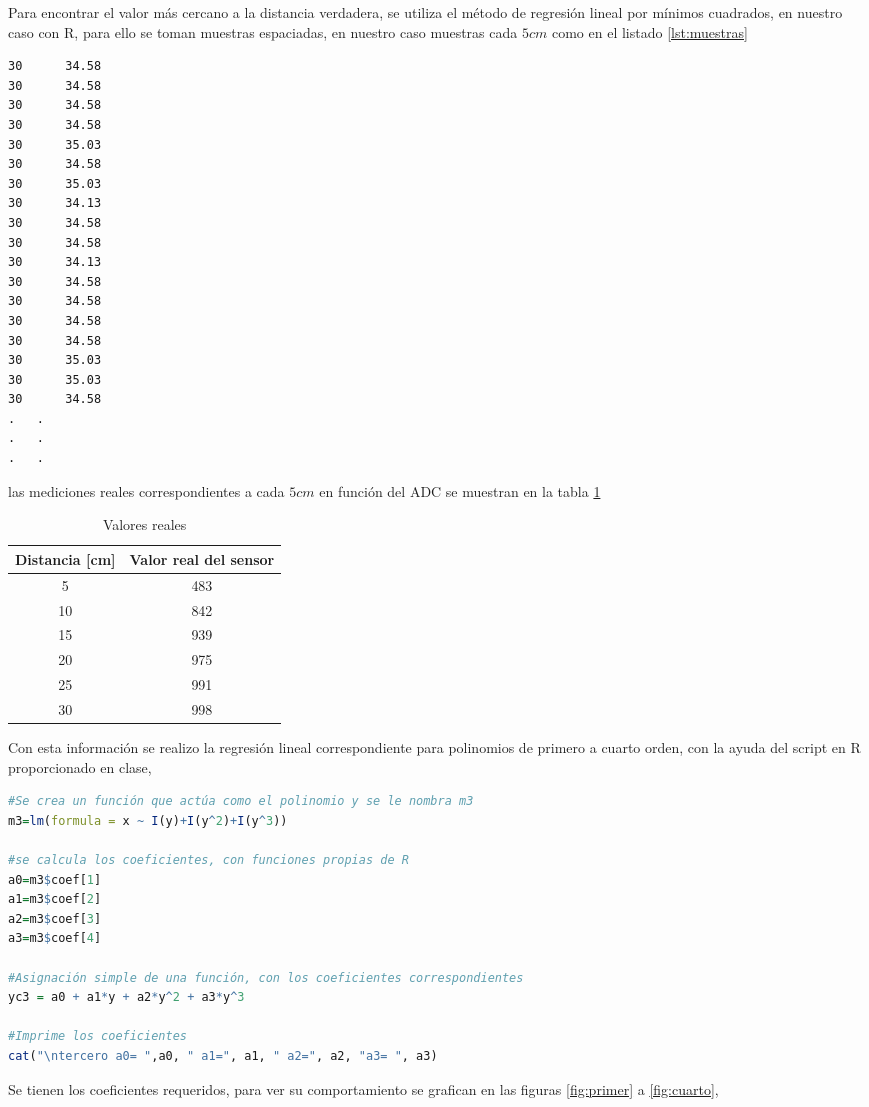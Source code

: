 \documentclass[letterpaper]{article}
\begin{document}
Para encontrar el valor más cercano a la distancia verdadera, se utiliza
el método de regresión lineal por mínimos cuadrados, en nuestro caso
con R, para ello se toman muestras espaciadas, en nuestro caso 
muestras cada $5 cm$ como en el listado \ref{lst:muestras}
\begin{lstlisting}[caption=Muestra de las muestras, label=lst:muestras]
30      34.58
30      34.58
30      34.58
30      34.58
30      35.03
30      34.58
30      35.03
30      34.13
30      34.58
30      34.58
30      34.13
30      34.58
30      34.58
30      34.58
30      34.58
30      35.03
30      35.03
30      34.58
.	.
.	.
.	.
\end{lstlisting}
las mediciones reales correspondientes a cada $5cm$ en función del ADC 
se muestran en la tabla \ref{tab:distReales}
\begin{table}
  \centering
  \begin{tabular}{c|c}
    Distancia [cm] & Valor real del sensor \\
    \hline
    \hline
    5 & 483 \\
    10 & 842 \\
    15 & 939 \\
    20 & 975 \\
    25 & 991 \\
    30 & 998 \\
  \end{tabular}
  \caption{Valores reales}
  \label{tab:distReales}
\end{table}
Con esta información se realizo la regresión lineal correspondiente para
polinomios de primero a cuarto orden, con la ayuda del script en R 
proporcionado en clase,
\begin{lstlisting}[language=R]
#Se crea un función que actúa como el polinomio y se le nombra m3
m3=lm(formula = x ~ I(y)+I(y^2)+I(y^3))

#se calcula los coeficientes, con funciones propias de R
a0=m3$coef[1]
a1=m3$coef[2]
a2=m3$coef[3]
a3=m3$coef[4]

#Asignación simple de una función, con los coeficientes correspondientes
yc3 = a0 + a1*y + a2*y^2 + a3*y^3

#Imprime los coeficientes
cat("\ntercero a0= ",a0, " a1=", a1, " a2=", a2, "a3= ", a3)
\end{lstlisting}

Se tienen los coeficientes requeridos, para ver su comportamiento se
grafican en las figuras \ref{fig:primer} a \ref{fig:cuarto}, 
\end{document}
